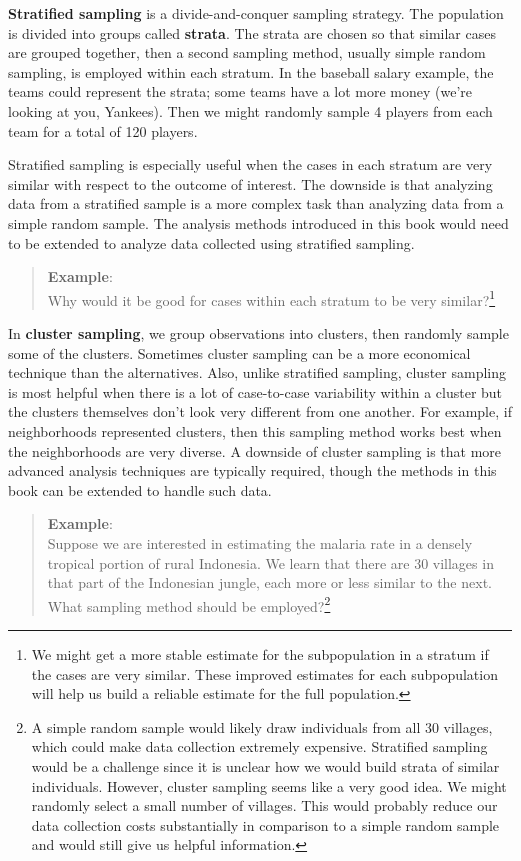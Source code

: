 \documentclass[
  letterpaper,
  DIV=11,
  numbers=noendperiod]{scrreprt}
\begin{document}
\textbf{Stratified sampling} is a divide-and-conquer sampling strategy.
The population is divided into groups called \textbf{strata}. The strata
are chosen so that similar cases are grouped together, then a second
sampling method, usually simple random sampling, is employed within each
stratum. In the baseball salary example, the teams could represent the
strata; some teams have a lot more money (we're looking at you,
Yankees). Then we might randomly sample 4 players from each team for a
total of 120 players.

Stratified sampling is especially useful when the cases in each stratum
are very similar with respect to the outcome of interest. The downside
is that analyzing data from a stratified sample is a more complex task
than analyzing data from a simple random sample. The analysis methods
introduced in this book would need to be extended to analyze data
collected using stratified sampling.

\begin{quote}
\textbf{Example}:\\
Why would it be good for cases within each stratum to be very
similar?\footnote{We might get a more stable estimate for the
  subpopulation in a stratum if the cases are very similar. These
  improved estimates for each subpopulation will help us build a
  reliable estimate for the full population.}
\end{quote}

In \textbf{cluster sampling}, we group observations into clusters, then
randomly sample some of the clusters. Sometimes cluster sampling can be
a more economical technique than the alternatives. Also, unlike
stratified sampling, cluster sampling is most helpful when there is a
lot of case-to-case variability within a cluster but the clusters
themselves don't look very different from one another. For example, if
neighborhoods represented clusters, then this sampling method works best
when the neighborhoods are very diverse. A downside of cluster sampling
is that more advanced analysis techniques are typically required, though
the methods in this book can be extended to handle such data.

\begin{quote}
\textbf{Example}:\\
Suppose we are interested in estimating the malaria rate in a densely
tropical portion of rural Indonesia. We learn that there are 30 villages
in that part of the Indonesian jungle, each more or less similar to the
next. What sampling method should be employed?\footnote{A simple random
  sample would likely draw individuals from all 30 villages, which could
  make data collection extremely expensive. Stratified sampling would be
  a challenge since it is unclear how we would build strata of similar
  individuals. However, cluster sampling seems like a very good idea. We
  might randomly select a small number of villages. This would probably
  reduce our data collection costs substantially in comparison to a
  simple random sample and would still give us helpful information.}
\end{quote}
\end{document}
